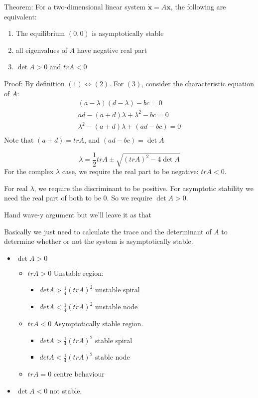 \documentclass{X:/Documents/Coding/Latex/myassignment}
\begin{document}
Theorem:
For a two-dimensional linear system $\dot{\mathbf{x}}= A \mathbf{x}$, the following are equivalent:

\begin{enumerate}
    \item The equilibrium $(0,0)$ is asymptotically stable
    \item all eigenvalues of $A$ have negative real part
    \item $\det A> 0$ and $tr A < 0$
\end{enumerate}

Proof:
By definition $(1) \Leftrightarrow (2)$.
For $(3)$, consider the characteristic equation of $A$:
\begin{align*}
    (a-\lambda) (d-\lambda) - bc = 0\\
    ad - (a+d)\lambda + \lambda ^2  - bc =0\\
    \lambda ^2  - (a+d)\lambda +(ad- bc) =0\\
\end{align*}
Note that $(a+d) = tr A$, and $(ad-bc) = \det A$

\[\lambda = \frac12 trA \pm \sqrt{(tr A)^2 - 4\det A}\]
For the complex $\lambda$ case, we require the real part to be negative: $tr A <0$.

For real $\lambda$, we require the discriminant to be positive. For asymptotic stability we need the real part of both to be $0$. So we require $\det A > 0$.


Hand wave-y argument but we'll leave it as that


Basically we just need to calculate the trace and the determinant of $A$ to determine whether or not the system is asymptotically stable.
\begin{itemize}
    \item $\det A > 0$
    \begin{itemize}
         \item $tr A > 0$ Unstable region:
         \begin{itemize}
             \item $det A > \frac14 (tr A)^2$ unstable spiral
             \item $det A < \frac14 (tr A)^2$ unstable node
         \end{itemize}
         \item $tr A < 0$ Asymptotically stable region.
         \begin{itemize}
             \item $det A > \frac14 (tr A)^2$ stable spiral
             \item $det A < \frac14 (tr A)^2$ stable node
         \end{itemize}
         \item $tr A = 0$ centre behaviour
     \end{itemize} 
    \item $\det A < 0$ not stable.
\end{itemize}
\end{document}
